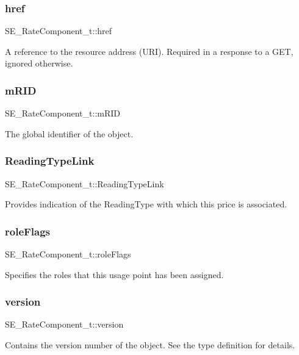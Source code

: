 \subsubsection{\texorpdfstring{href}{href}}
{\footnotesize\ttfamily S\+E\+\_\+\+Rate\+Component\+\_\+t\+::href}

A reference to the resource address (U\+RI). Required in a response to a G\+ET, ignored otherwise. \mbox{\label{group__RateComponent_ga5febd8e03509ea29e372b4a5863809b6}} 
\subsubsection{\texorpdfstring{m\+R\+ID}{mRID}}
{\footnotesize\ttfamily S\+E\+\_\+\+Rate\+Component\+\_\+t\+::m\+R\+ID}

The global identifier of the object. \mbox{\label{group__RateComponent_ga108a8aae6b28aac45112a19b50ac3da0}} 
\subsubsection{\texorpdfstring{Reading\+Type\+Link}{ReadingTypeLink}}
{\footnotesize\ttfamily S\+E\+\_\+\+Rate\+Component\+\_\+t\+::\+Reading\+Type\+Link}

Provides indication of the Reading\+Type with which this price is associated. \mbox{\label{group__RateComponent_ga8641fd093a5e97212c53250b6509c5ed}} 
\subsubsection{\texorpdfstring{role\+Flags}{roleFlags}}
{\footnotesize\ttfamily S\+E\+\_\+\+Rate\+Component\+\_\+t\+::role\+Flags}

Specifies the roles that this usage point has been assigned. \mbox{\label{group__RateComponent_ga0d6a6b7bf2528185f64ae073eabea734}} 
\subsubsection{\texorpdfstring{version}{version}}
{\footnotesize\ttfamily S\+E\+\_\+\+Rate\+Component\+\_\+t\+::version}

Contains the version number of the object. See the type definition for details. 
